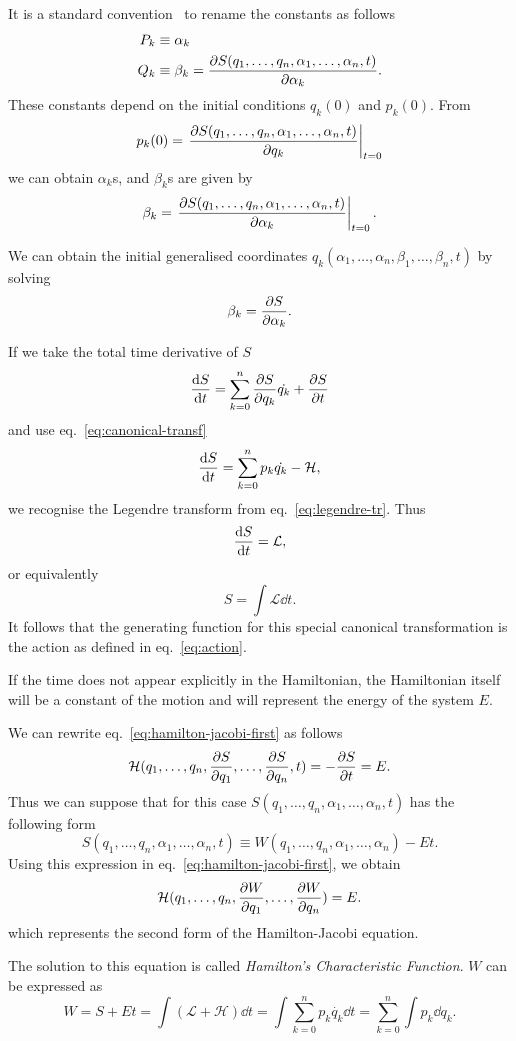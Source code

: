 \documentclass[../thesis.tex]{subfiles}
\theoremstyle{plain}
\begin{document}
It is a standard convention~\cite{Goldstein2002} to rename the constants as follows
\begin{align*}
  P_k &\equiv \alpha_k \\
  Q_k &\equiv \beta_k = \pdv{S(q_1,\dotsc,q_n,\alpha_1,\dotsc,\alpha_n,t)}{\alpha_k}.
\end{align*}
These constants depend on the initial conditions \(q_k(0)\) and \(p_k(0)\). From
\[
  p_k(0) = \eval{\pdv{S(q_1,\dotsc,q_n,\alpha_1,\dotsc,\alpha_n,t)}{q_k}}_{t=0}
\]
we can obtain \(\alpha_k\)s, and \(\beta_k\)s are given by
\[
  \beta_k = \eval{\pdv{S(q_1,\dotsc,q_n,\alpha_1,\dotsc,\alpha_n,t)}{\alpha_k}}_{t=0}.
\]

We can obtain the initial generalised coordinates
\(q_k(\alpha_1,\dotsc,\alpha_n,\beta_1,\dotsc,\beta_n,t)\) by solving
\[
  \beta_k=\pdv{S}{\alpha_k}.
\]

If we take the total time derivative of \(S\)
\[
  \dv{S}{t} = \sum_{k=0}^{n} \pdv{S}{q_k} \dot{q_k} + \pdv{S}{t}
\]
and use eq.~\eqref{eq:canonical-transf}
\[
  \dv{S}{t} = \sum_{k=0}^{n} p_k \dot{q_k} - \mathcal{H},
\]
we recognise the Legendre transform from eq.~\eqref{eq:legendre-tr}. Thus
\[
  \dv{S}{t} = \mathcal{L},
\]
or equivalently
\[
  S = \int \mathcal{L} \dd{t}.
\]
It follows that the generating function for this special canonical transformation
is the action as defined in eq.~\eqref{eq:action}.

If the time does not appear explicitly in the Hamiltonian, the Hamiltonian itself
will be a constant of the motion and will represent the energy of the system \(E\).

We can rewrite eq.~\eqref{eq:hamilton-jacobi-first} as follows
\[
  \mathcal{H}(q_1,\dotsc,q_n,\pdv{S}{q_1},\dotsc,\pdv{S}{q_n},t) = - \pdv{S}{t} = E.
\]
Thus we can suppose that for this case \(S(q_1,\dotsc,q_n,\alpha_1,\dotsc,\alpha_n,t)\)
has the following form
\[
  S(q_1,\dotsc,q_n,\alpha_1,\dotsc,\alpha_n,t) \equiv W(q_1,\dotsc,q_n,\alpha_1,\dotsc,\alpha_n) - Et.
\]
Using this expression in eq.~\eqref{eq:hamilton-jacobi-first}, we obtain
\begin{equation}
  \label{eq:hamilton-jacobi-second}
  \mathcal{H}(q_1,\dotsc,q_n,\pdv{W}{q_1},\dotsc,\pdv{W}{q_n}) = E.
\end{equation}
which represents the second form of the Hamilton-Jacobi equation.

The solution to this equation is called \emph{Hamilton's Characteristic Function}.
\(W\) can be expressed as
\[
  W = S + Et = \int \left(\mathcal{L} + \mathcal{H} \right) \dd{t}
    = \int \sum_{k=0}^n p_k \dot{q_k} \dd{t}
    = \sum_{k=0}^n \int p_k \dd{q_k}.
\]
\end{document}
